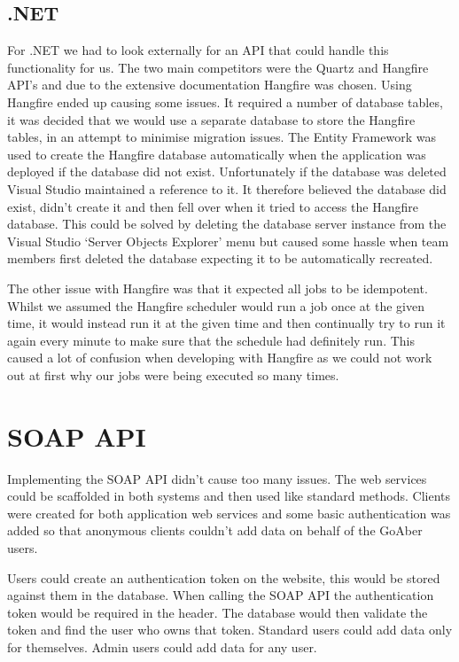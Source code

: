 \subsection{.NET}
For .NET we had to look externally for an API that could handle this functionality for us. The two main competitors were the Quartz\cite{quartz} and Hangfire\cite{hangfire} API’s and due to the extensive documentation Hangfire was chosen.
Using Hangfire ended up causing some issues. It required a number of database tables, it was decided that we would use a separate database to store the Hangfire tables, in an attempt to minimise migration issues. The Entity Framework was used to create the Hangfire database automatically when the application was deployed if the database did not exist. Unfortunately if the database was deleted Visual Studio maintained a reference to it. It therefore believed the database did exist, didn’t create it and then fell over when it tried to access the Hangfire database. This could be solved by deleting the database server instance from the Visual Studio ‘Server Objects Explorer’ menu but caused some hassle when team members first deleted the database expecting it to be automatically recreated. \par
The other issue with Hangfire was that it expected all jobs to be idempotent. Whilst we assumed the Hangfire scheduler would run a job once at the given time, it would instead run it at the given time and then continually try to run it again every minute to make sure that the schedule had definitely run. This caused a lot of confusion when developing with Hangfire as we could not work out at first why our jobs were being executed so many times. 
\section{SOAP API}
Implementing the SOAP API didn’t cause too many issues. The web services could be scaffolded in both systems and then used like standard methods. Clients were created for both application web services and some basic authentication was added so that anonymous clients couldn’t add data on behalf of the GoAber users. \par 
Users could create an authentication token on the website, this would be stored against them in the database. When calling the SOAP API the authentication token would be required in the header. The database would then validate the token and find the user who owns that token. Standard users could add data only for themselves. Admin users could add data for any user.

